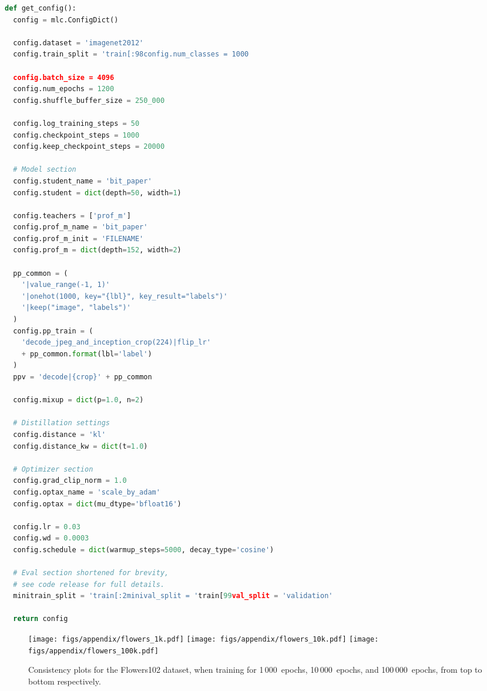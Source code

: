 \documentclass[10pt,twocolumn,letterpaper]{article}
\begin{document}
\begin{lstlisting}[language=Python, caption=Full config for ImageNet distillation.]
def get_config():
  config = mlc.ConfigDict()

  config.dataset = 'imagenet2012'
  config.train_split = 'train[:98config.num_classes = 1000

  config.batch_size = 4096
  config.num_epochs = 1200
  config.shuffle_buffer_size = 250_000

  config.log_training_steps = 50
  config.checkpoint_steps = 1000
  config.keep_checkpoint_steps = 20000

  # Model section
  config.student_name = 'bit_paper'
  config.student = dict(depth=50, width=1)

  config.teachers = ['prof_m']
  config.prof_m_name = 'bit_paper'
  config.prof_m_init = 'FILENAME'
  config.prof_m = dict(depth=152, width=2)

  pp_common = (
    '|value_range(-1, 1)'
    '|onehot(1000, key="{lbl}", key_result="labels")'
    '|keep("image", "labels")'
  )
  config.pp_train = (
    'decode_jpeg_and_inception_crop(224)|flip_lr' 
    + pp_common.format(lbl='label')
  )
  ppv = 'decode|{crop}' + pp_common

  config.mixup = dict(p=1.0, n=2)

  # Distillation settings
  config.distance = 'kl'
  config.distance_kw = dict(t=1.0)

  # Optimizer section
  config.grad_clip_norm = 1.0
  config.optax_name = 'scale_by_adam'
  config.optax = dict(mu_dtype='bfloat16')

  config.lr = 0.03
  config.wd = 0.0003
  config.schedule = dict(warmup_steps=5000, decay_type='cosine')

  # Eval section shortened for brevity,
  # see code release for full details.
  minitrain_split = 'train[:2minival_split = 'train[99val_split = 'validation'

  return config

\end{lstlisting}



\begin{figure*}[ht]\centering
    \texttt{[image: figs/appendix/flowers\_1k.pdf]}
    \texttt{[image: figs/appendix/flowers\_10k.pdf]}
    \texttt{[image: figs/appendix/flowers\_100k.pdf]}
\caption{Consistency plots for the Flowers102 dataset, when training for 1\,000~epochs, 10\,000~epochs, and 100\,000~epochs, from top to bottom respectively.}\label{fig:app:consistency_flowers}\end{figure*}
\end{document}
